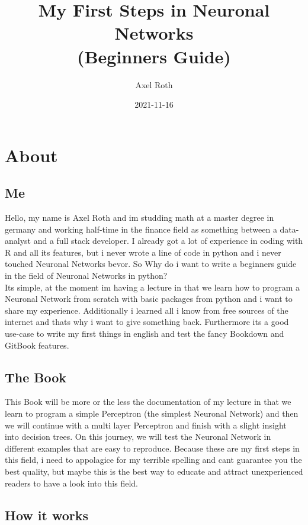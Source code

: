 \documentclass[
]{book}
\title{My First Steps in Neuronal Networks\\
(Beginners Guide)}
\author{Axel Roth}
\date{2021-11-16}
\begin{document}
\maketitle

{
\setcounter{tocdepth}{1}
\tableofcontents
}
\hypertarget{about}{%
\chapter{About}\label{about}}

\hypertarget{me}{%
\section{Me}\label{me}}

Hello, my name is Axel Roth and im studding math at a master degree in germany and working half-time in the finance field as something between a data-analyst and a full stack developer. I already got a lot of experience in coding with R and all its features, but i never wrote a line of code in python and i never touched Neuronal Networks bevor. So Why do i want to write a beginners guide in the field of Neuronal Networks in python?\\
Its simple, at the moment im having a lecture in that we learn how to program a Neuronal Network from scratch with basic packages from python and i want to share my experience. Additionally i learned all i know from free sources of the internet and thats why i want to give something back. Furthermore its a good use-case to write my first things in english and test the fancy Bookdown and GitBook features.

\hypertarget{the-book}{%
\section{The Book}\label{the-book}}

This Book will be more or the less the documentation of my lecture in that we learn to program a simple Perceptron (the simplest Neuronal Network) and then we will continue with a multi layer Perceptron and finish with a slight insight into decision trees. On this journey, we will test the Neuronal Network in different examples that are easy to reproduce. Because these are my first steps in this field, i need to appolagice for my terrible spelling and cant guarantee you the best quality, but maybe this is the best way to educate and attract unexperienced readers to have a look into this field.

\hypertarget{how-it-works}{%
\section{How it works}\label{how-it-works}}
\end{document}
